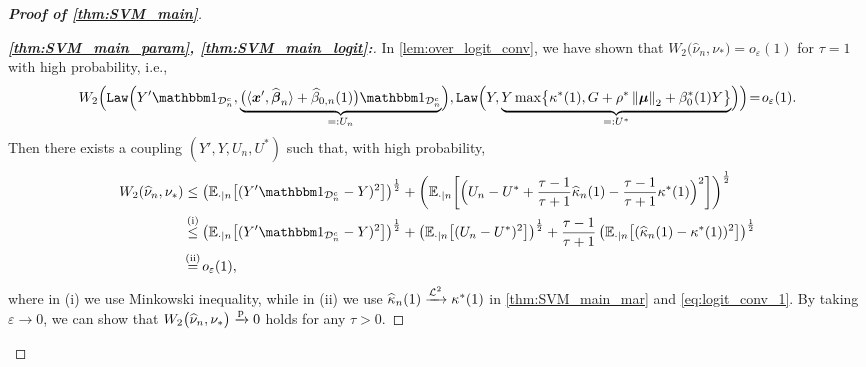 \begin{proof}[\textbf{Proof of \cref{thm:SVM_main}}]
\begin{proof}[\textbf{\emph{\ref{thm:SVM_main_param}, \ref{thm:SVM_main_logit}:}}]
In \cref{lem:over_logit_conv}, we have shown that $W_2\bigl( \hat \nu_{n}, \nu_* \bigr) = o_\varepsilon(1)$ for $\tau = 1$ with high probability, i.e.,
\begin{equation}
\label{eq:logit_conv_1}
    W_2 \Bigl(
        \Law \Bigl(
        Y'\ind_{\cD_n^c} ,
        \underbrace{    
        \bigl( \< \xx', \hat\vbeta_n \> + \hat\beta_{0,n}(1) \bigr) \ind_{\cD_n^c}
        }_{ =: U_n} \Bigr)
        ,
        \Law \Bigl( 
        Y,
            \underbrace{    
        Y\max \bigl\{ \kappa^*(1) , G + \rho^*\norm{\vmu}_2 + \beta_0^*(1) Y \bigr\} 
        }_{=: U^*} \Bigr)
        \Bigr)
    \! = \!
    o_\varepsilon(1).
\end{equation}
Then there exists a coupling $(Y', Y, U_n, U^*)$ such that, with high probability, 
\begin{align*}
    W_2( \hat \nu_{n},  \nu_* )
    & \le   
        \left( \E_{\cdot | n} \bigl[ (
           Y'\ind_{\cD_n^c} - Y 
        )^2 \bigr] \right)^{\frac12} 
        + \left( \E_{\cdot | n} \biggl[ \Bigl(
           U_n - U^*  + \frac{\tau - 1}{\tau + 1} \hat\kappa_n(1) - \frac{\tau - 1}{\tau + 1} \kappa^*(1)
        \Bigr)^2 \biggr] \right)^{\frac12} 
        \\
    & \overset{\mathmakebox[0pt][c]{\text{(i)}}}{\le}
        \left( \E_{\cdot | n} \bigl[ (
           Y'\ind_{\cD_n^c} - Y 
        )^2 \bigr] \right)^{\frac12} 
        +
        \left( \E_{\cdot | n} \bigl[ (
            U_n - U^* 
        )^2 \bigr] \right)^{\frac12} 
        +
        \frac{\tau - 1}{\tau + 1}
         \left( \E_{\cdot | n} \bigl[ (
            \hat\kappa_n(1) - \kappa^*(1) 
        )^2 \bigr] \right)^{\frac12}
        \\
    & \overset{\mathmakebox[0pt][c]{\text{(ii)}}}{=}  o_\varepsilon(1),
\end{align*}
where in (i) we use Minkowski inequality, while in (ii) we use $\widehat\kappa_n(1) \xrightarrow{\mathcal{L}^{2}} \kappa^*(1)$ in \ref{thm:SVM_main_mar} and \cref{eq:logit_conv_1}. By taking $\varepsilon \to 0$, we can show that $W_2\bigl( \widehat \nu_{n}, \nu_* \bigr) \xrightarrow{\mathrm{p}} 0$ holds for any $\tau > 0$.


\end{proof}
\end{proof}
